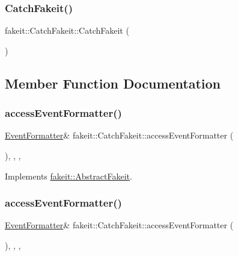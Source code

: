 \subsubsection{\texorpdfstring{CatchFakeit()}{CatchFakeit()}\hspace{0.1cm}{\footnotesize\ttfamily [2/2]}}
{\footnotesize\ttfamily fakeit\+::\+Catch\+Fakeit\+::\+Catch\+Fakeit (\begin{DoxyParamCaption}{ }\end{DoxyParamCaption})\hspace{0.3cm}{\ttfamily [inline]}}



\subsection{Member Function Documentation}
\mbox{\label{classfakeit_1_1CatchFakeit_aaadf534923d2255186e3a13446828b05}} 
\subsubsection{\texorpdfstring{accessEventFormatter()}{accessEventFormatter()}\hspace{0.1cm}{\footnotesize\ttfamily [1/2]}}
{\footnotesize\ttfamily \mbox{\hyperlink{structfakeit_1_1EventFormatter}{Event\+Formatter}}\& fakeit\+::\+Catch\+Fakeit\+::access\+Event\+Formatter (\begin{DoxyParamCaption}{ }\end{DoxyParamCaption})\hspace{0.3cm}{\ttfamily [inline]}, {\ttfamily [override]}, {\ttfamily [protected]}, {\ttfamily [virtual]}}



Implements \mbox{\hyperlink{classfakeit_1_1AbstractFakeit_a443a7ac12208c55f2ae4fa072e983476}{fakeit\+::\+Abstract\+Fakeit}}.

\mbox{\label{classfakeit_1_1CatchFakeit_aaadf534923d2255186e3a13446828b05}} 
\subsubsection{\texorpdfstring{accessEventFormatter()}{accessEventFormatter()}\hspace{0.1cm}{\footnotesize\ttfamily [2/2]}}
{\footnotesize\ttfamily \mbox{\hyperlink{structfakeit_1_1EventFormatter}{Event\+Formatter}}\& fakeit\+::\+Catch\+Fakeit\+::access\+Event\+Formatter (\begin{DoxyParamCaption}{ }\end{DoxyParamCaption})\hspace{0.3cm}{\ttfamily [inline]}, {\ttfamily [override]}, {\ttfamily [protected]}, {\ttfamily [virtual]}}



